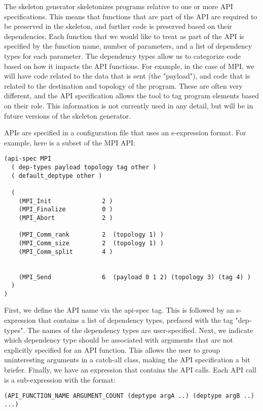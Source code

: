 The skeleton generator skeletonizes programs relative to one or more
API specifications.  This means that functions that are part of the
API are required to be preserved in the skeleton, and further code is
preserved based on their dependencies.  Each function that we would
like to treat as part of the API is specified by the function name,
number of parameters, and a list of dependency types for each
parameter.  The dependency types allow us to categorize code based on
how it impacts the API functions.  For example, in the case of MPI, we
will have code related to the data that is sent (the "payload"), and
code that is related to the destination and topology of the program.
These are often very different, and the API specification allows the
tool to tag program elements based on their role.  This information is
not currently used in any detail, but will be in future versions of
the skeleton generator.

APIs are specified in a configuration file that uses an s-expression
format.  For example, here is a subset of the MPI API:

\begin{verbatim}
(api-spec MPI
  ( dep-types payload topology tag other )
  ( default_deptype other )

  (
    (MPI_Init              2 )
    (MPI_Finalize          0 )
    (MPI_Abort             2 )

    (MPI_Comm_rank         2  (topology 1) )
    (MPI_Comm_size         2  (topology 1) )
    (MPI_Comm_split        4 )


    (MPI_Send              6  (payload 0 1 2) (topology 3) (tag 4) )
  )
)
\end{verbatim}

First, we define the API name via the api-spec tag.  This is followed
by an s-expression that contains a list of dependency types, prefaced
with the tag "dep-types".  The names of the dependency types are
user-specified.  Next, we indicate which dependency type should be
associated with arguments that are not explicitly specified for an API
function.  This allows the user to group uninteresting arguments in a
catch-all class, making the API specification a bit briefer.  Finally,
we have an expression that contains the API calls.  Each API call is a
sub-expression with the format:

\begin{verbatim}
(API_FUNCTION_NAME ARGUMENT_COUNT (deptype argA ..) (deptype argB ..) ...)
\end{verbatim}

